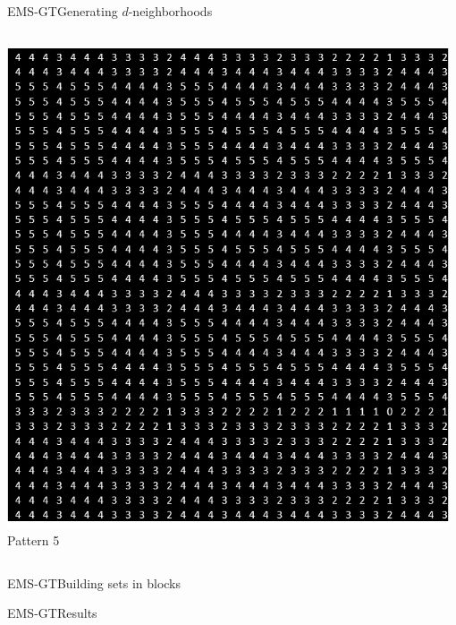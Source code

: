 \documentclass[pdf,xcolor={dvipsnames}]{beamer}
\begin{document}
\begin{frame}{EMS-GT}{Generating $d$-neighborhoods}
\begin{itemize}
{\begin{columns}
			\begin{column}{.135\textwidth}\centering\includegraphics[width=0.98\textwidth]{img/5}\\Pattern 5 \end{column}
			\end{columns}

			}
		\end{itemize}
	\end{frame}


\begin{frame}{EMS-GT}{Building sets in blocks}
	
	\end{frame}

\begin{frame}{EMS-GT}{Results}

	\end{frame}
\end{document}
